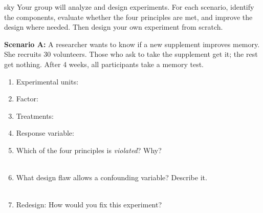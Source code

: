 \documentclass[10pt]{article}
\begin{document}
\namepartnerperiod

\vspace{0.1in}

\begin{scenariobox}[Context]{sky}
\small
Your group will analyze and design experiments. For each scenario, identify the
components, evaluate whether the four principles are met, and improve the design
where needed. Then design your own experiment from scratch.
\end{scenariobox}

\vspace{0.1in}

\textbf{Scenario A:} A researcher wants to know if a new supplement improves memory.
She recruits 30 volunteers. Those who ask to take the supplement get it; the rest get
nothing. After 4 weeks, all participants take a memory test.

\begin{practicebox}
\small
\begin{enumerate}[leftmargin=1.5em, itemsep=7pt]
  \item Experimental units: 
  \item Factor: 
  \item Treatments: 
  \item Response variable: 
  \item Which of the four principles is \emph{violated}?  Why?\\
        \\[1pt]
  \item What design flaw allows a confounding variable? Describe it.\\
        \\[1pt]
  \item Redesign: How would you fix this experiment?\\
        \\[1pt]
\end{enumerate}
\end{practicebox}
\end{document}
